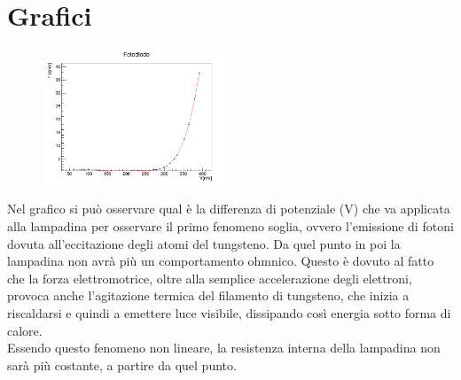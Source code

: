 \documentclass[10pt,twocolumn]{article}
\begin{document}
\twocolumn

\section{Grafici}
\begin{figure}[H] %
  \centering
  \includegraphics[width=0.5\textwidth]{curva_voltammetrica/fotodiodo.png} %
  \label{fig:I/V_fotodiodo}
\end{figure}
Nel grafico si può osservare qual è la differenza di potenziale (V) che va applicata alla lampadina per osservare il primo fenomeno soglia, ovvero l'emissione di fotoni dovuta all'eccitazione degli atomi del tungsteno.
Da quel punto in poi la lampadina non avrà più un comportamento ohmnico. Questo è dovuto al fatto che la forza elettromotrice, oltre alla semplice accelerazione degli elettroni, provoca anche l'agitazione termica del filamento di tungsteno, che inizia a riscaldarsi e quindi a emettere luce visibile, dissipando così energia sotto forma di calore. \\
Essendo questo fenomeno non lineare, la resistenza interna della lampadina non sarà più costante, a partire da quel punto. 
\end{document}
